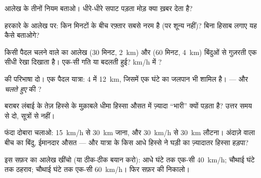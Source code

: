 \begin{exercise}[$\star$]\label{exo:g7:motion-average-speed:4}
आलेख के तीनों नियम बताओ। धीरे-धीरे सपाट पड़ता मोड़ क्या ख़बर देता है?
\end{exercise}

\begin{exercise}[$\star$]\label{exo:g7:motion-average-speed:5}
हरकारे के आलेख पर: किन मिनटों के बीच रफ़्तार सबसे नरम है (पर शून्य
नहीं)? बिना हिसाब लगाए यह कैसे बताओगे?
\end{exercise}

\begin{exercise}[$\star$]\label{exo:g7:motion-average-speed:6}
किसी पैदल चलने वाले का आलेख ($30$ मिनट, \qty{2}{km}) और ($60$ मिनट,
\qty{4}{km}) बिंदुओं से गुज़रती एक सीधी रेखा दिखाता है। एक-सी गति या
बदलती हुई? \unit{km/h} में ?
\end{exercise}

\begin{exercise}[$\star$]\label{exo:g7:motion-average-speed:7}
 की परिभाषा दो। एक पैदल यात्रा: $4$  में \qty{12}{km},
जिसमें एक घंटे का जलपान भी शामिल है।  --- और \emph{चलते हुए}
की ?
\end{exercise}

\begin{exercise}[$\star\star$]\label{exo:g7:motion-average-speed:8}
बराबर लंबाई के तेज़ हिस्से के मुक़ाबले धीमा हिस्सा औसत में ज़्यादा
``भारी'' क्यों पड़ता है? उत्तर समय से दो, सूत्रों से नहीं।
\end{exercise}

\begin{exercise}[$\star\star$]\label{exo:g7:motion-average-speed:9}
फंदा दोबारा चलाओ: \qty{15}{km/h} से \qty{30}{km} जाना, और
\qty{30}{km/h} से \qty{30}{km} लौटना। अंदाज़े वाला बीच का बिंदु,
ईमानदार औसत --- और यात्रा के किस आधे हिस्से ने घड़ी का ज़्यादातर
हिस्सा हड़पा?
\end{exercise}

\begin{exercise}[$\star\star$]\label{exo:g7:motion-average-speed:10}
इस सफ़र का आलेख खींचो (या ठीक-ठीक बयान करो): आधे घंटे तक एक-सी
\qty{40}{km/h}; चौथाई घंटे तक ठहराव; चौथाई घंटे तक एक-सी
\qty{60}{km/h}। फिर सफ़र की  निकालो।
\end{exercise}

